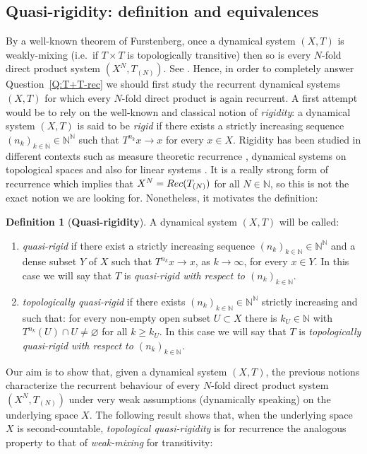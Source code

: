 \documentclass[openright,11pt]{article}
\theoremstyle{plain}
\theoremstyle{definition}
\newtheorem{definition}[theorem]{Definition}
\newcommand{\NN}{\mathbb{N}}
\newcommand{\Rec}{\textup{Rec}}
\begin{document}
\subsection{Quasi-rigidity: definition and equivalences}\label{SubSec:2.1qr}

By a well-known theorem of Furstenberg, once a dynamical system $(X,T)$ is weakly-mixing (i.e.\ if $T\times T$ is topologically transitive) then so is every $N$-fold direct product system $(X^N,T_{(N)})$. See \cite[Theorem~1.51]{GrPe2011_book}. Hence, in order to completely answer Question~\ref{Q:T+T-rec} we should first study the recurrent dynamical systems $(X,T)$ for which every $N$-fold direct product is again recurrent. A first attempt would be to rely on the well-known and classical notion of {\em rigidity}: a dynamical system $(X,T)$ is said to be {\em rigid} if there exists a strictly increasing sequence $(n_k)_{k\in\NN} \in \NN^{\NN}$ such that $T^{n_k}x \to x$ for every $x \in X$. Rigidity has been studied in different contexts such as measure theoretic recurrence \cite{FursWeiss1977}, dynamical systems on topological spaces \cite{GlasMaon1989} and also for linear systems \cite{EisGri2011,CoMaPa2014}. It is a really strong form of recurrence which implies that $X^N=\Rec(T_{(N)})$ for all $N \in \NN$, so this is not the exact notion we are looking for. Nonetheless, it motivates the definition:

\begin{definition}[\textbf{Quasi-rigidity}]\label{Def:qr}
	A dynamical system $(X,T)$ will be called:
	\begin{enumerate}[--]
		\item {\em quasi-rigid} if there exist a strictly increasing sequence $(n_k)_{k \in \NN} \in \NN^{\NN}$ and a dense subset $Y$ of $X$ such that $T^{n_k}x \to x$, as $k\to\infty$, for every $x \in Y$. In this case we will say that $T$ is {\em quasi-rigid with respect to $(n_k)_{k \in \NN}$}.
		
		\item {\em topologically quasi-rigid} if there exists $(n_k)_{k \in \NN} \in \NN^{\NN}$ strictly increasing and such that: for every non-empty open subset $U \subset X$ there is $k_U \in \NN$ with $T^{n_k}(U) \cap U \neq \varnothing$ for all $k\geq k_U$. In this case we will say that $T$ is {\em topologically quasi-rigid with respect to $(n_k)_{k \in \NN}$}.
	\end{enumerate}
\end{definition}

Our aim is to show that, given a dynamical system $(X,T)$, the previous notions characterize the recurrent behaviour of every $N$-fold direct product system $(X^N,T_{(N)})$ under very weak assumptions (dynamically speaking) on the underlying space $X$. The following result shows that, when the underlying space $X$ is second-countable, {\em topological quasi-rigidity} is for recurrence the analogous property to that of {\em weak-mixing} for transitivity:
\end{document}
